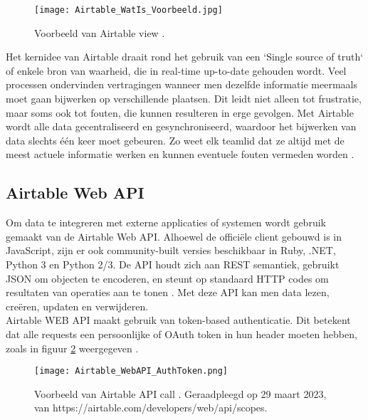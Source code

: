 \begin{figure}
    \centering
    \texttt{[image: Airtable\_WatIs\_Voorbeeld.jpg]}
    \caption{Voorbeeld van Airtable view \autocite{AirtableWhat}.}
    \label{fig:exampleairtable}
\end{figure}

Het kernidee van Airtable draait rond het gebruik van een `Single source of truth` of enkele bron van waarheid, die in real-time up-to-date gehouden wordt. Veel processen ondervinden vertragingen 
wanneer men dezelfde informatie meermaals moet gaan bijwerken op verschillende plaatsen. Dit leidt niet alleen tot frustratie, maar soms ook tot fouten, die kunnen resulteren in erge gevolgen. Met Airtable wordt alle data gecentraliseerd en gesynchroniseerd, waardoor het bijwerken van data slechts één keer moet gebeuren. Zo weet elk teamlid dat ze altijd met de meest actuele informatie werken en kunnen eventuele fouten vermeden worden \autocite{AirtableWhat}. \\

\subsection{Airtable Web API}
\label{subsec:airtable_web_API}


Om data te integreren met externe applicaties of systemen wordt gebruik gemaakt van de Airtable Web API. Alhoewel de officiële client gebouwd is in JavaScript, zijn er ook community-built versies beschikbaar in Ruby, .NET, Python 3 en Python 2/3. De API houdt zich aan REST semantiek, gebruikt JSON om objecten te encoderen, en steunt op standaard HTTP codes om resultaten van operaties aan te tonen \autocite{AirtableAPI}. Met deze API kan men data lezen, creëren, updaten en verwijderen. \\

Airtable WEB API maakt gebruik van token-based authenticatie. Dit betekent dat alle requests een persoonlijke of OAuth token in hun header moeten hebben, zoals in figuur \ref{fig:airtable_authtoken} weergegeven \autocite{AirtableAPIAuthentication}. \\

\begin{figure}
    \centering
    \texttt{[image: Airtable\_WebAPI\_AuthToken.png]}
    \caption{Voorbeeld van Airtable API call \autocite{AirtableAPIAuthentication}. Geraadpleegd op 29 maart 2023, van https://airtable.com/developers/web/api/scopes.}
    \label{fig:airtable_authtoken}
\end{figure}

